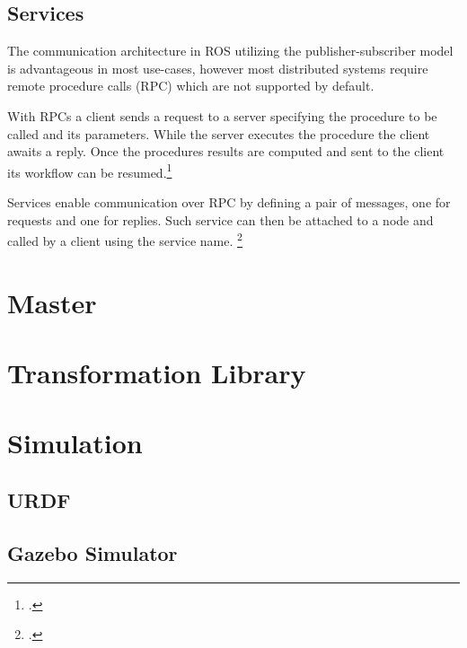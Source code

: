 \subsection{Services}
The communication architecture in ROS utilizing the publisher-subscriber model is advantageous in most use-cases, however most distributed systems require remote procedure calls (RPC) which are not supported by default.

With RPCs a client sends a request to a server specifying the procedure to be called and its parameters. While the server executes the procedure the client awaits a reply. Once the procedures results are computed and sent to the client its workflow can be resumed.\footcite[Page 3]{rfc1831}

Services enable communication over RPC by defining a pair of messages, one for requests and one for replies. Such service can then be attached to a node and called by a client using the service name. \footcite{openSourceRoboticsFoundationServicesNodate}




\section{Master}



\section{Transformation Library}



\section{Simulation}



\subsection{URDF}



\subsection{Gazebo Simulator}



\filbreak